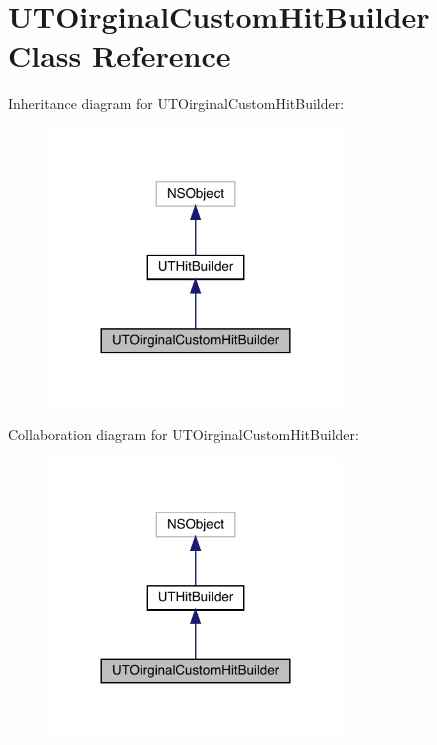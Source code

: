 \hypertarget{interface_u_t_oirginal_custom_hit_builder}{}\section{U\+T\+Oirginal\+Custom\+Hit\+Builder Class Reference}
\label{interface_u_t_oirginal_custom_hit_builder}


Inheritance diagram for U\+T\+Oirginal\+Custom\+Hit\+Builder\+:\nopagebreak
\begin{figure}[H]
\begin{center}
\leavevmode
\includegraphics[width=221pt]{interface_u_t_oirginal_custom_hit_builder__inherit__graph}
\end{center}
\end{figure}


Collaboration diagram for U\+T\+Oirginal\+Custom\+Hit\+Builder\+:\nopagebreak
\begin{figure}[H]
\begin{center}
\leavevmode
\includegraphics[width=221pt]{interface_u_t_oirginal_custom_hit_builder__coll__graph}
\end{center}
\end{figure}
